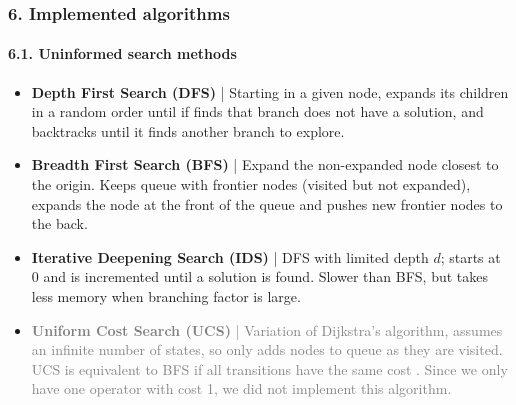 \documentclass{beamer}
\begin{document}
\begin{frame}
\frametitle{6. Implemented algorithms}
\framesubtitle{6.1. Uninformed search methods}

\begin{itemize}
  \item \textbf{Depth First Search (DFS)} | Starting in a given node, expands its children in a random order until if finds that branch does not have a solution, and backtracks until it finds another branch to explore. 
  
  \item \textbf{Breadth First Search (BFS)} |  Expand the non-expanded node closest to the origin. Keeps queue with frontier nodes (visited but not expanded), expands the node at the front of the queue and pushes new frontier nodes to the back.
  
  \item \textbf{Iterative Deepening Search (IDS)} | DFS with limited depth $d$; starts at $0$ and is incremented until a solution is found. Slower than BFS, but takes less memory when branching factor is large.
  
  \item \textcolor{gray}{\textbf{Uniform Cost Search (UCS)} | Variation of Dijkstra's algorithm, assumes an infinite number of states, so only adds nodes to queue as they are visited.
  UCS is equivalent to BFS if all transitions have the same cost \cite{javatpoint-uninformed}.
  Since we only have one operator with cost 1, we did not implement this algorithm.}
\end{itemize}
\end{frame}
\end{document}
